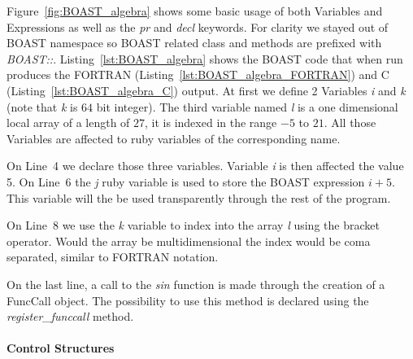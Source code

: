 \documentclass[review]{elsarticle}
\begin{document}
Figure~\ref{fig:BOAST_algebra} shows some basic usage of both Variables and
Expressions as well as the \emph{pr} and \emph{decl} keywords. For clarity we
stayed out of BOAST namespace so BOAST related class and methods are prefixed
with \emph{BOAST::}. Listing~\ref{lst:BOAST_algebra} shows the BOAST code that
when run produces the FORTRAN (Listing~\ref{lst:BOAST_algebra_FORTRAN}) and C
(Listing~\ref{lst:BOAST_algebra_C}) output. At first we define 2 Variables
\emph{i} and \emph{k} (note that \emph{k} is $64$ bit integer). The third variable
named \emph{l} is a one dimensional local array of a length of $27$, it is indexed
in the range $-5$ to $21$. All those Variables are affected to ruby variables
of the corresponding name.

On Line~4 we declare those three variables. Variable \emph{i} is then affected
the value 5. On Line~6 the \emph{j} ruby variable is used to store the BOAST
expression \emph{$i+5$}. This variable will the be used transparently through
the rest of the program.

On Line~8 we use the \emph{k} variable to index into the array \emph{l} using
the bracket operator. Would the array be multidimensional the index would be
coma separated, similar to FORTRAN notation.

On the last line, a call to the \emph{sin} function is made through the creation
of a FuncCall object.  The possibility to use this method is declared using the
\emph{register\_funccall} method.

      \paragraph{Control Structures}
\end{document}
